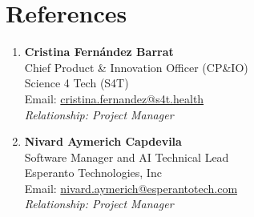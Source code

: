 \documentclass[a4paper,10pt]{article}
\begin{document}
\newpage

\section{\textbf{References}}
\vspace{1mm}
\small{
\begin{enumerate}[leftmargin=*,labelsep=2mm]
\item \textbf{Cristina Fernández Barrat}\\
   Chief Product \& Innovation Officer (CP\&IO) \\
   Science 4 Tech (S4T) \\
   Email: \href{mailto:cristina.fernandez@s4t.health}{cristina.fernandez@s4t.health}\\
   \textit{Relationship: Project Manager}
\vspace{1mm}
\item \textbf{Nivard Aymerich Capdevila}\\
   Software Manager and AI Technical Lead \\
   Esperanto Technologies, Inc \\
   Email: \href{nivard.aymerich@esperantotech.com}{nivard.aymerich@esperantotech.com} \\
   \textit{Relationship: Project Manager}

\end{enumerate}
}
\end{document}
